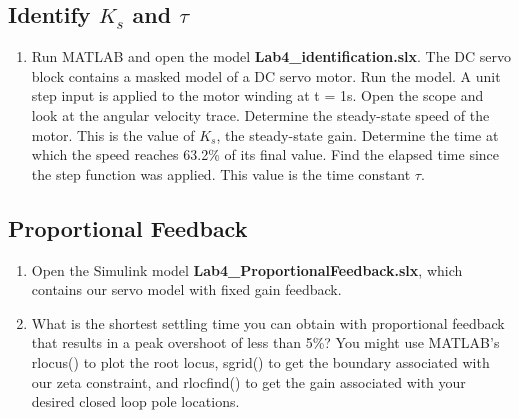 \documentclass[11pt,a4paper]{article}
\begin{document}
\subsection{Identify $K_{s}$ and $\tau$}
\begin{enumerate}
\item Run MATLAB and open the model \textbf{Lab4\_identification.slx}. The DC servo block contains a masked model of a DC servo motor. Run the model. A unit step input is applied to the motor winding at t = 1s. Open the scope and look at the angular velocity trace. Determine the steady-state speed of the motor. This is the value of $K_{s}$, the steady-state gain. Determine the time at which the speed reaches 63.2\% of its final value. Find the elapsed time since the step function was applied. This value is the time constant $\tau$.
 
\end{enumerate}






\subsection{Proportional Feedback}
\begin{enumerate}
\item Open the Simulink model \textbf{Lab4\_ProportionalFeedback.slx}, which contains our servo model with fixed gain feedback. 

\item What is the shortest settling time you can obtain with proportional feedback that results in a peak overshoot of less than 5\%? You might use MATLAB's rlocus() to plot the root locus, sgrid() to get the boundary associated with our zeta constraint, and rlocfind() to get the gain associated with your desired closed loop pole locations.

\end{enumerate}
\end{document}

